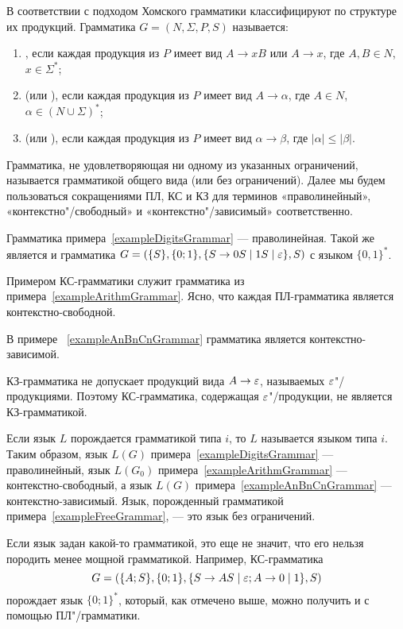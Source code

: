 В соответствии с подходом Хомского грамматики классифицируют по структуре их продукций. Грамматика $G=(N,\Sigma,P,S)$ называется:
\begin{enumerate}
    \item {}, если каждая продукция из $P$
    имеет вид
    $A \to xB$ или $A \to x$, где $A,B \in N$, $x\in\Sigma^*$;

    \item {} (или ),
    если каждая продукция из
    $P$ имеет вид $A \to \alpha$, где $A \in N$,
    $\alpha\in(N\cup\Sigma)^*$;

    \item {} (или ),
    если каждая продукция из $P$ имеет вид
    $\alpha\to\beta$, где $|\alpha| \le |\beta|$.
\end{enumerate}

Грамматика, не удовлетворяющая ни одному из указанных ограничений,
называется грамматикой общего вида (или без ограничений). Далее мы
будем пользоваться сокращениями ПЛ, КС и КЗ для терминов
«праволинейный», «кон\-текс\-тно"/свободный» и «контекстно"/зависимый»
соответственно.

Грамматика примера~\ref{exampleDigitsGrammar} --- праволинейная. Такой же является и грамматика $G=(\{S\},\{0;1\},\{S\to0S\mid1S\mid\varepsilon\},S)$ с языком $\{0,1\}^*$.

Примером КС-грамматики служит грамматика из примера~\ref{exampleArithmGrammar}. Ясно, что
каждая ПЛ-грамматика является контекстно-свободной.

В примере ~\ref{exampleAnBnCnGrammar} грамматика является контекстно-зависимой.

КЗ-грамматика не допускает продукций вида $A\to\varepsilon$, называемых
$\varepsilon$"/продукциями. Поэтому КС-грамматика, содержащая
$\varepsilon$"/продукции, не является КЗ-грамматикой.

Если язык $L$ порождается грамматикой типа $i$, то $L$ называется
языком типа $i$. Таким образом, язык $L(G)$ примера~\ref{exampleDigitsGrammar} ---
праволинейный, язык $L(G_0)$ примера~\ref{exampleArithmGrammar} --- контекстно-свободный, а
язык $L(G)$ примера~\ref{exampleAnBnCnGrammar} --- контекстно-зависимый. Язык, порожденный
грамматикой примера~\ref{exampleFreeGrammar}, --- это язык без ограничений.

Если язык задан какой-то грамматикой, это еще не значит, что его нельзя породить менее мощной грамматикой. Например, КС-грамматика
\[
	G=(\{A;S\}, \{0;1\}, \{S\to AS \mid \varepsilon; A \to 0 \mid 1 \}, S)
\]
порождает язык $\{0;1\}^*$, который, как отмечено выше, можно
получить и с помощью ПЛ"/грамматики.

